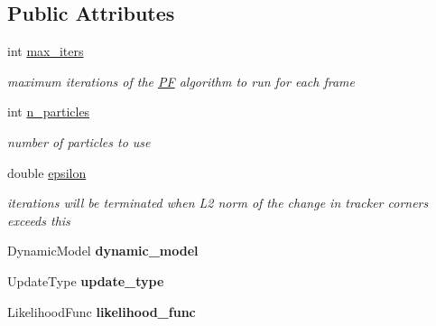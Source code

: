 \subsection*{Public Attributes}
\begin{DoxyCompactItemize}
\item 
\hypertarget{structPFParams_a247f6354e907eac4019b5f194dc00e53}{int \hyperlink{structPFParams_a247f6354e907eac4019b5f194dc00e53}{max\-\_\-iters}}\label{structPFParams_a247f6354e907eac4019b5f194dc00e53}

\begin{DoxyCompactList}\small\item\em maximum iterations of the \hyperlink{classPF}{P\-F} algorithm to run for each frame \end{DoxyCompactList}\item 
\hypertarget{structPFParams_a477fbc13d753c5a2567897c21fca0815}{int \hyperlink{structPFParams_a477fbc13d753c5a2567897c21fca0815}{n\-\_\-particles}}\label{structPFParams_a477fbc13d753c5a2567897c21fca0815}

\begin{DoxyCompactList}\small\item\em number of particles to use \end{DoxyCompactList}\item 
\hypertarget{structPFParams_a2f779f3d665bf9f47b9391925079c20a}{double \hyperlink{structPFParams_a2f779f3d665bf9f47b9391925079c20a}{epsilon}}\label{structPFParams_a2f779f3d665bf9f47b9391925079c20a}

\begin{DoxyCompactList}\small\item\em iterations will be terminated when L2 norm of the change in tracker corners exceeds this \end{DoxyCompactList}\item 
\hypertarget{structPFParams_ac56b189c2a24f2f1f3c38d07deb8c585}{Dynamic\-Model {\bfseries dynamic\-\_\-model}}\label{structPFParams_ac56b189c2a24f2f1f3c38d07deb8c585}

\item 
\hypertarget{structPFParams_ac4b9cf4177a4dba2ebd662a799d80a89}{Update\-Type {\bfseries update\-\_\-type}}\label{structPFParams_ac4b9cf4177a4dba2ebd662a799d80a89}

\item 
\hypertarget{structPFParams_a679af338dadc2742635540cd493d567e}{Likelihood\-Func {\bfseries likelihood\-\_\-func}}\label{structPFParams_a679af338dadc2742635540cd493d567e}


\end{DoxyCompactItemize}
